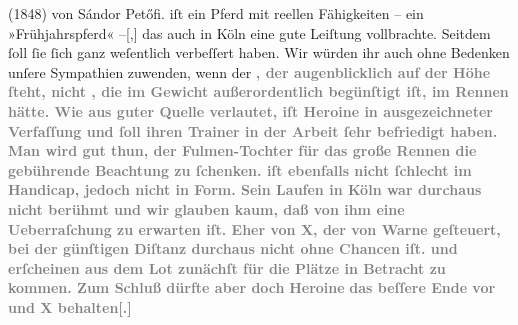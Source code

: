 \begin{ledgroupsized}[t]{13cm}
{{{{{                        (1848) von Sándor
                     Petőfi.}}}\label{K_L02914-6h} iſt ein Pferd mit reellen Fähigkeiten – ein
                  »Frühjahrspferd« –{[},{]} das auch in Köln eine gute Leiſtung vollbrachte. Seitdem ſoll ſie ſich
                  ganz weſentlich verbeſſert haben. Wir würden ihr auch ohne Bedenken unſere
                  Sympathien zuwenden, wenn der }}\textcolor{gray}{\textbf{}}\textcolor{gray}{\textbf{, der augenblicklich auf der Höhe ſteht, nicht
                     , die im Gewicht außerordentlich begünſtigt
                  iſt, im Rennen hätte. Wie aus guter Quelle verlautet, iſt Heroine in
                  ausgezeichneter Verfaſſung und ſoll ihren Trainer in der Arbeit ſehr befriedigt
                  haben. Man wird gut thun, der Fulmen-Tochter für das große Rennen die gebührende
                  Beachtung zu ſchenken.  iſt ebenfalls nicht
                  ſchlecht im Handicap, jedoch nicht in Form. Sein Laufen in Köln war durchaus nicht berühmt und wir glauben kaum, daß
                  von ihm eine Ueberraſchung zu erwarten iſt. Eher von \textsc{X},
                  der von Warne geſteuert, bei der günſtigen
                  Diſtanz durchaus nicht ohne Chancen iſt.  und  erſcheinen aus dem Lot zunächſt für die Plätze in
                  Betracht zu kommen. Zum Schluß dürfte aber doch}}\pend
           \pstart
           \centering{}\textcolor{gray}{\textbf{\textbf{Heroine}}}\pend
           \pstart
           \noindent{}\textcolor{gray}{\textbf{das beſſere Ende vor}}{ }\textcolor{gray}{\textbf{}}\textcolor{gray}{\textbf{{ }und \textsc{X}
                     behalten{[}.{]}}}\pend
           
         
         \endnumbering{}\end{ledgroupsized}  \newcommand{\dateiname}{L02914}\newcommand{\titel}{Paul Goldmann an Arthur Schnitzler, 2. 5. [1900]}\newcommand{\editorInnen}{Martin Anton Müller und Laura Untner}
      
